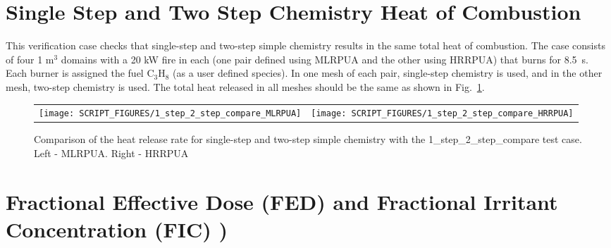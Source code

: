 \documentclass[11pt]{book}
\begin{document}
\section{Single Step and Two Step Chemistry Heat of Combustion}
\label{1_step_2_step_M}
\label{1_step_2_step_H}

This verification case checks that single-step and two-step simple chemistry results in the same total heat of combustion. The case consists of four 1 m$^3$ domains with a 20 kW fire in each (one pair defined using {\textct MLRPUA} and the other using {\textct HRRPUA}) that burns for 8.5~s. Each burner is assigned the fuel C$_3$H$_8$ (as a user defined species). In one mesh of each pair, single-step chemistry is used, and in the other mesh, two-step chemistry is used. The total heat released in all meshes should be the same as shown in Fig.~\ref{fig:1_step_2_step}.
\begin{figure}[h!]
   \begin{tabular*}{\textwidth}{lr}
      \texttt{[image: SCRIPT\_FIGURES/1\_step\_2\_step\_compare\_MLRPUA]} &
      \texttt{[image: SCRIPT\_FIGURES/1\_step\_2\_step\_compare\_HRRPUA]}
   \end{tabular*}
   \caption[Result of the 1\_step\_2\_step\_compare test case]{Comparison of the heat release rate for single-step and two-step simple chemistry with the 1\_step\_2\_step\_compare test case. Left - MLRPUA. Right - HRRPUA}
   \label{fig:1_step_2_step}
\end{figure}



\section{Fractional Effective Dose (FED) and Fractional Irritant Concentration (FIC) ) }
\end{document}
